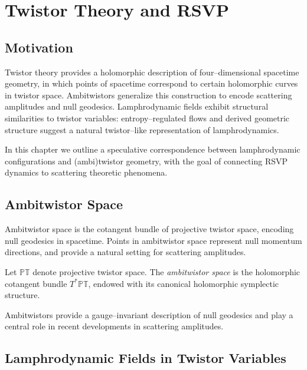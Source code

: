 
\chapter{Twistor Theory and RSVP}
\label{chap:twistor-rsvp}

\section{Motivation}

Twistor theory provides a holomorphic description of four--dimensional
spacetime geometry, in which points of spacetime correspond to certain
holomorphic curves in twistor space. Ambitwistors generalize this
construction to encode scattering amplitudes and null geodesics.
Lamphrodynamic fields exhibit structural similarities to twistor
variables: entropy--regulated flows and derived geometric structure
suggest a natural twistor--like representation of lamphrodynamics.

In this chapter we outline a speculative correspondence between
lamphrodynamic configurations and (ambi)twistor geometry, with the goal
of connecting RSVP dynamics to scattering theoretic phenomena.


\section{Ambitwistor Space}

Ambitwistor space is the cotangent bundle of projective twistor space,
encoding null geodesics in spacetime. Points in ambitwistor space
represent null momentum directions, and provide a natural setting for
scattering amplitudes.

\begin{definition}
Let $\mathbb{PT}$ denote projective twistor space. The \emph{ambitwistor
space} is the holomorphic cotangent bundle $T^\ast\mathbb{PT}$, endowed
with its canonical holomorphic symplectic structure.
\end{definition}

\begin{remark}
Ambitwistors provide a gauge--invariant description of null geodesics
and play a central role in recent developments in scattering amplitudes.
\end{remark}


\section{Lamphrodynamic Fields in Twistor Variables}

